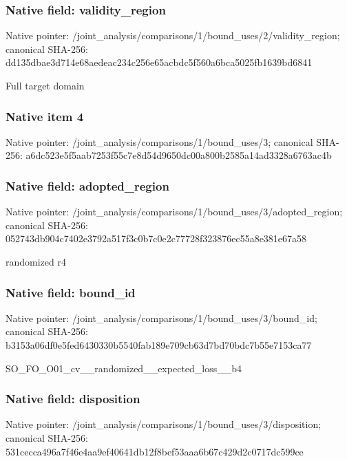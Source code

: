 \documentclass[10pt,a4paper]{article}
\begin{document}
\subsubsection{Native field: validity\_\allowbreak{}region}
Native pointer: /joint\_\allowbreak{}analysis/comparisons/1/bound\_\allowbreak{}uses/2/validity\_\allowbreak{}region; canonical SHA-256: dd135dbae3d714e68aedeac234c256e65acbdc5f560a6bca5025fb1639bd6841

\begingroup\raggedright\sloppy Full target domain\par\endgroup

\subsubsection{Native item 4}
Native pointer: /joint\_\allowbreak{}analysis/comparisons/1/bound\_\allowbreak{}uses/3; canonical SHA-256: a6dc523e5f5aab7253f55c7e8d54d9650dc00a800b2585a14ad3328a6763ac4b

\subsubsection{Native field: adopted\_\allowbreak{}region}
Native pointer: /joint\_\allowbreak{}analysis/comparisons/1/bound\_\allowbreak{}uses/3/adopted\_\allowbreak{}region; canonical SHA-256: 052743db904c7402e3792a517f3c0b7c0e2c77728f323876ec55a8e381e67a58

\begingroup\raggedright\sloppy randomized r4\par\endgroup

\subsubsection{Native field: bound\_\allowbreak{}id}
Native pointer: /joint\_\allowbreak{}analysis/comparisons/1/bound\_\allowbreak{}uses/3/bound\_\allowbreak{}id; canonical SHA-256: b3153a06df0e5fed6430330b5540fab189e709cb63d7bd70bdc7b55e7153ca77

\begingroup\raggedright\sloppy SO\_\allowbreak{}FO\_\allowbreak{}O01\_\allowbreak{}cv\_\allowbreak{}\_\allowbreak{}randomized\_\allowbreak{}\_\allowbreak{}expected\_\allowbreak{}loss\_\allowbreak{}\_\allowbreak{}b4\par\endgroup

\subsubsection{Native field: disposition}
Native pointer: /joint\_\allowbreak{}analysis/comparisons/1/bound\_\allowbreak{}uses/3/disposition; canonical SHA-256: 531cecca496a7f46e4aa9ef40641db12f8bef53aaa6b67c429d2c0717dc599ce
\end{document}
